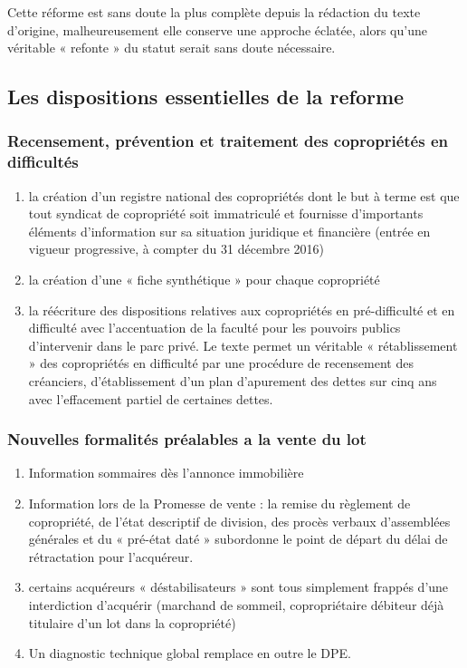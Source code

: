 			Cette réforme est sans doute la plus complète depuis la rédaction du texte d’origine, malheureusement elle conserve une approche éclatée, alors qu’une véritable « refonte » du statut serait sans doute nécessaire.
		
		\subsection{Les dispositions essentielles de la reforme}
		
			\subsubsection{Recensement, prévention et traitement des copropriétés en difficultés}
				\begin{enumerate}
					\item la création d'un registre national des copropriétés dont le but à terme est que tout syndicat de copropriété soit immatriculé et fournisse d'importants éléments d'information sur sa situation juridique et financière (entrée en vigueur progressive, à compter du 31 décembre 2016)
					\item la création d’une « fiche synthétique » pour chaque copropriété
					\item la réécriture des dispositions relatives aux copropriétés en pré-difficulté et en difficulté avec l'accentuation de la faculté pour les pouvoirs publics d'intervenir dans le parc privé. Le texte permet un véritable « rétablissement » des copropriétés en difficulté par une procédure de recensement des créanciers, d'établissement d'un plan d'apurement des dettes sur cinq ans avec l'effacement partiel de certaines dettes.
				\end{enumerate}
			
			\subsubsection{Nouvelles formalités préalables a la vente du lot}
				\begin{enumerate}
					\item Information sommaires dès l’annonce immobilière
					\item Information lors de la Promesse de vente : la remise du règlement de copropriété, de l’état descriptif de division, des procès verbaux d’assemblées générales et du « pré-état daté » subordonne le point de départ du délai de rétractation pour l’acquéreur.
					\item certains acquéreurs « déstabilisateurs » sont tous simplement frappés d’une interdiction d’acquérir (marchand de sommeil, copropriétaire débiteur déjà titulaire d’un lot dans la copropriété)
					\item Un diagnostic technique global remplace en outre le DPE.
				\end{enumerate}
			
